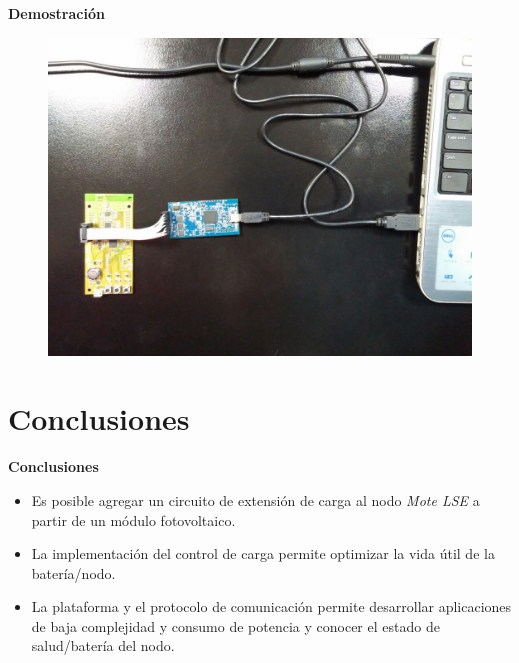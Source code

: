 \documentclass[aspectratio=43, handout]{beamer}
\begin{document}
\begin{frame}{\textbf{\LARGE{Demostración}}}
\begin{center}
		\begin{figure}[H]
			{\includegraphics[width=.9\textwidth]{./imagenes/debu.jpg}}
		\end{figure}	  
\end{center}	 	  	
\end{frame}

\section{Conclusiones}
\begin{frame}{\textbf{\LARGE{Conclusiones}}}
\fontsize{15pt}{15}\selectfont
\begin{itemize}
			\item Es posible agregar un circuito de extensión de carga al nodo \textit{Mote LSE} a partir de un módulo fotovoltaico.
					\vspace{10px}
			\item La implementación del control de carga permite optimizar la vida útil de la batería/nodo.
					\vspace{10px}
			\item La plataforma y el protocolo de comunicación permite desarrollar aplicaciones de baja complejidad y consumo de potencia y conocer el estado de salud/batería del nodo.
		\end{itemize}	  	
\end{frame}
\end{document}
